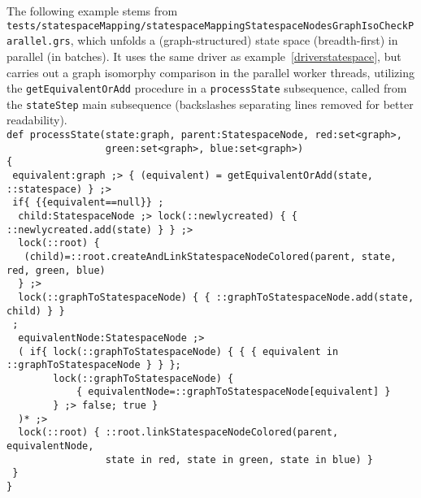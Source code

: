 \begin{example}
The following example stems from \texttt{tests/statespace\-Mapping/statespace\-Mapping\-Statespace\-Nodes\-Graph\-Iso\-Check\-Parallel.grs}, which unfolds a (graph-structured) state space (breadth-first) in parallel (in batches).
It uses the same driver as example~\ref{driverstatespace}, but carries out a graph isomorphy comparison in the parallel worker threads, utilizing the \texttt{getEquivalentOrAdd} procedure in a \texttt{processState} subsequence, called from the \texttt{stateStep} main subsequence (backslashes separating lines removed for better readability).\\
\verb#def processState(state:graph, parent:StatespaceNode, red:set<graph>,#\\
\verb#                 green:set<graph>, blue:set<graph>)#\\
\verb#{#\\
\verb# equivalent:graph ;> { (equivalent) = getEquivalentOrAdd(state, ::statespace) } ;>#\\
\verb# if{ {{equivalent==null}} ;#\\
\verb#  child:StatespaceNode ;> lock(::newlycreated) { { ::newlycreated.add(state) } } ;>#\\
\verb#  lock(::root) { #\\
\verb#   (child)=::root.createAndLinkStatespaceNodeColored(parent, state, red, green, blue)#\\
\verb#  } ;>#\\
\verb#  lock(::graphToStatespaceNode) { { ::graphToStatespaceNode.add(state, child) } }#\\
\verb# ;#\\
\verb#  equivalentNode:StatespaceNode ;>#\\
\verb#  ( if{ lock(::graphToStatespaceNode) { { { equivalent in ::graphToStatespaceNode } } };#\\
\verb#        lock(::graphToStatespaceNode) {#\\
\verb#            { equivalentNode=::graphToStatespaceNode[equivalent] }#\\
\verb#        } ;> false; true }#\\
\verb#  )* ;>#\\
\verb#  lock(::root) { ::root.linkStatespaceNodeColored(parent, equivalentNode,#\\
\verb#                 state in red, state in green, state in blue) }#\\
\verb# }#\\
\verb#}#
\end{example}


